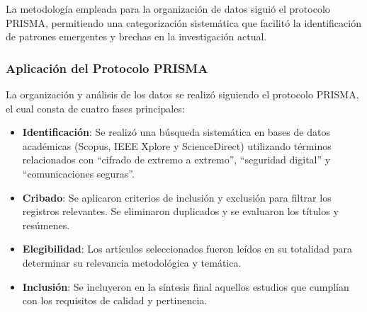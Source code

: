 \documentclass[spanish,12pt,a4paper]{article}
\begin{document}
	La metodología empleada para la organización de datos siguió el protocolo PRISMA, permitiendo una categorización sistemática que facilitó la identificación de patrones emergentes y brechas en la investigación actual.
	\subsubsection*{Aplicación del Protocolo PRISMA}
	
	La organización y análisis de los datos se realizó siguiendo el protocolo PRISMA, el cual consta de cuatro fases principales:
	
	\begin{itemize}
		\item \textbf{Identificación}: Se realizó una búsqueda sistemática en bases de datos académicas (Scopus, IEEE Xplore y ScienceDirect) utilizando términos relacionados con “cifrado de extremo a extremo”, “seguridad digital” y “comunicaciones seguras”.
		\item \textbf{Cribado}: Se aplicaron criterios de inclusión y exclusión para filtrar los registros relevantes. Se eliminaron duplicados y se evaluaron los títulos y resúmenes.
		\item \textbf{Elegibilidad}: Los artículos seleccionados fueron leídos en su totalidad para determinar su relevancia metodológica y temática.
		\item \textbf{Inclusión}: Se incluyeron en la síntesis final aquellos estudios que cumplían con los requisitos de calidad y pertinencia.
	\end{itemize}
\end{document}
